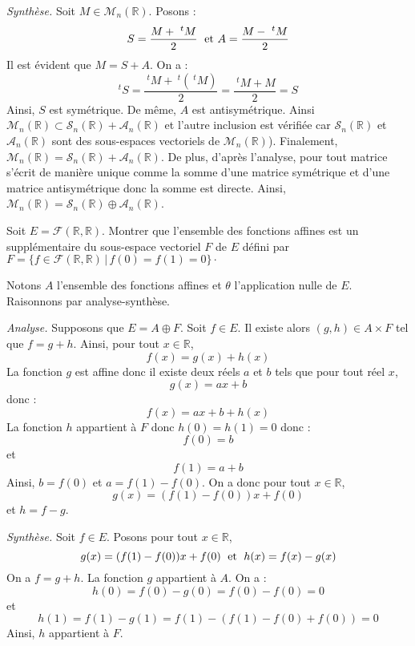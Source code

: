 \documentclass[a4paper,10pt]{report}
\begin{document}
\medskip

\noindent \textit{Synthèse.} Soit $M \in \mathcal{M}_n(\mathbb{R})$. Posons : 
$$ S = \dfrac{M + ~^t M}{2} \; \hbox{ et } A = \dfrac{M-~^tM}{2}$$
Il est évident que $M=S+A$. On a :
$$ ^t{} S = \dfrac{~^t M + ~^t(~^t M)}{2} = \dfrac{~^t M + M}{2} = S$$
Ainsi, $S$ est symétrique. De même, $A$ est antisymétrique.
 Ainsi $\mathcal{M}_n(\mathbb{R}) \subset \mathcal{S}_n(\mathbb{R}) + \mathcal{A}_n(\mathbb{R})$ et l'autre inclusion est vérifiée car $\mathcal{S}_n(\mathbb{R})$ et $\mathcal{A}_n(\mathbb{R})$ sont des sous-espaces vectoriels de $\mathcal{M}_n(\mathbb{R})$). Finalement, $\mathcal{M}_n(\mathbb{R}) = \mathcal{S}_n(\mathbb{R}) + \mathcal{A}_n(\mathbb{R})$. De plus, d'après l'analyse, pour tout matrice s'écrit de manière unique comme la somme d'une matrice symétrique et d'une matrice antisymétrique donc la somme est directe. Ainsi, $\mathcal{M}_n(\mathbb{R})= \mathcal{S}_n(\mathbb{R}) \oplus \mathcal{A}_n(\mathbb{R})$.
 
\medskip


\begin{Exercice}{} Soit $E = \mathcal{F}(\mathbb{R}, \mathbb{R})$. Montrer que l'ensemble des fonctions affines est un supplémentaire du sous-espace vectoriel $F$ de $E$ défini par $F = \lbrace f \in \mathcal{F}(\mathbb{R}, \mathbb{R}) \, \vert \, f(0)=f(1)=0 \rbrace\cdot$
\end{Exercice}

\corr Notons $A$ l'ensemble des fonctions affines et $\theta$ l'application nulle de $E$. Raisonnons par analyse-synthèse.

\medskip

\noindent \textit{Analyse.} Supposons que $E = A \oplus F$. Soit $f \in E$. Il existe alors $(g,h) \in A \times F$ tel que $f=g+h$. Ainsi, pour tout $x \in \mathbb{R}$,
$$ f(x) =g(x)+h(x)$$
La fonction $g$ est affine donc il existe deux réels $a$ et $b$ tels que pour tout réel $x$,
$$ g(x) = ax+b$$
donc :
$$ f(x) = ax+b + h(x)$$
La fonction $h$ appartient à $F$ donc $h(0)=h(1)=0$ donc :
$$ f(0) = b$$
et 
$$ f(1) = a+b$$
Ainsi, $b=f(0)$ et $a=f(1)-f(0)$. On a donc pour tout $x \in \mathbb{R}$,
$$ g(x) = (f(1)-f(0))x + f(0)$$
et $h=f-g$.

\medskip

\noindent \textit{Synthèse.} Soit $f \in E$. Posons pour tout $x \in \mathbb{R}$,
$$ g(x) = (f(1)-f(0))x + f(0) \; \hbox{ et } \; h(x)=f(x)-g(x)$$
On a $f=g+h$. La fonction $g$ appartient à $A$. On a :
$$ h(0) = f(0)-g(0) = f(0)-f(0)=0$$
et
$$ h(1) = f(1)-g(1) = f(1)- (f(1)-f(0)+f(0))= 0$$
Ainsi, $h$ appartient à $F$.
\end{document}

